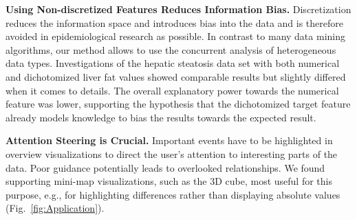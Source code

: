 \documentclass[journal]{style/vgtc} 			          %
\newcommand{\com}[1]{\textcolor{orange}{\uline{#1}}}
\begin{document}
\textbf{Using Non-discretized Features Reduces Information Bias.}
Discretization reduces the information space and introduces bias into the data and is therefore avoided in epidemiological research as possible.
In contrast to many data mining algorithms, our method allows to use the concurrent analysis of heterogeneous data types.
Investigations of the hepatic steatosis data set with both numerical and dichotomized liver fat values showed comparable results but slightly differed when it comes to details. %
The overall explanatory power towards the numerical feature was lower, supporting the hypothesis that the dichotomized target feature already models knowledge to bias the results towards the expected result.

\textbf{Attention Steering is Crucial.}
Important events have to be highlighted in overview visualizations to direct the user's attention to interesting parts of the data.
Poor guidance potentially leads to overlooked relationships.
We found supporting mini-map visualizations, such as the 3D cube, most useful for this purpose, e.g., for highlighting differences rather than displaying absolute values (Fig.~\ref{fig:Application}).



\end{document}

